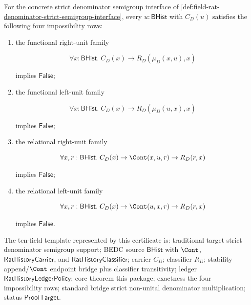 \begin{theorem}
\label{thm:field-rat-denominator-carried-unit-obstruction-package}
For the concrete strict denominator semigroup interface of
\autoref{def:field-rat-denominator-strict-semigroup-interface}, every
$u:\mathsf{BHist}$ with $C_D(u)$ satisfies the following four impossibility
rows:
\begin{enumerate}
  \item the functional right-unit family

  $$
  \forall x:\mathsf{BHist}.\;
  C_D(x)\to R_D(\mu_D(x,u),x)
  $$

  implies $\mathsf{False}$;

  \item the functional left-unit family

  $$
  \forall x:\mathsf{BHist}.\;
  C_D(x)\to R_D(\mu_D(u,x),x)
  $$

  implies $\mathsf{False}$;

  \item the relational right-unit family

  $$
  \forall x,r:\mathsf{BHist}.\;
  C_D(x)\to \Cont(x,u,r)\to R_D(r,x)
  $$

  implies $\mathsf{False}$;

  \item the relational left-unit family

  $$
  \forall x,r:\mathsf{BHist}.\;
  C_D(x)\to \Cont(u,x,r)\to R_D(r,x)
  $$

  implies $\mathsf{False}$.
\end{enumerate}

The ten-field template represented by this certificate is: traditional target
strict denominator semigroup support; BEDC source $\mathsf{BHist}$ with
$\Cont$, $\mathsf{RatHistoryCarrier}$, and
$\mathsf{RatHistoryClassifier}$; carrier $C_D$; classifier $R_D$; stability
append/$\Cont$ endpoint bridge plus classifier transitivity; ledger
$\mathsf{RatHistoryLedgerPolicy}$; core theorem this package; exactness the
four impossibility rows; standard bridge strict non-unital denominator
multiplication; status $\mathsf{ProofTarget}$.
\end{theorem}
